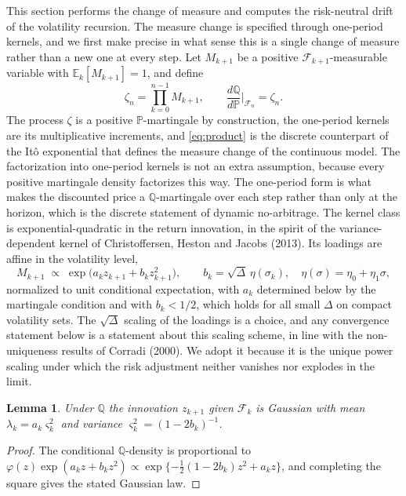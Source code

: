 \documentclass[11pt]{article}
\newtheorem{lemma}[theorem]{Lemma}
\theoremstyle{remark}
\newcommand{\E}{\mathbb{E}}
\newcommand{\Pm}{\mathbb{P}}
\newcommand{\Qm}{\mathbb{Q}}
\newcommand{\Dt}{\Delta}
\begin{document}
This section performs the change of measure and computes the risk-neutral
drift of the volatility recursion.
The measure change is specified through one-period kernels, and we first
make precise in what sense this is a single change of measure rather than a
new one at every step.
Let $M_{k+1}$ be a positive $\mathcal{F}_{k+1}$-measurable variable with
$\E_k[M_{k+1}]=1$, and define
\begin{equation}\label{eq:product}
\zeta_n=\prod_{k=0}^{n-1}M_{k+1},
\qquad
\frac{d\Qm}{d\Pm}\Big|_{\mathcal{F}_n}=\zeta_n .
\end{equation}
The process $\zeta$ is a positive $\Pm$-martingale by construction, the
one-period kernels are its multiplicative increments, and \eqref{eq:product}
is the discrete counterpart of the It\^{o} exponential that defines the
measure change of the continuous model.
The factorization into one-period kernels is not an extra assumption,
because every positive martingale density factorizes this way.
The one-period form is what makes the discounted price a $\Qm$-martingale
over each step rather than only at the horizon, which is the discrete
statement of dynamic no-arbitrage.
The kernel class is exponential-quadratic in the return innovation, in the
spirit of the variance-dependent kernel of Christoffersen, Heston and
Jacobs (2013).
Its loadings are affine in the volatility level,
\begin{equation}\label{eq:kernel}
M_{k+1}
\;\propto\;
\exp\!\big(a_k z_{k+1}+b_k z_{k+1}^2\big),
\qquad
b_k=\sqrt{\Dt}\,\eta(\sigma_k),\quad
\eta(\sigma)=\eta_0+\eta_1\sigma ,
\end{equation}
normalized to unit conditional expectation, with $a_k$ determined below by
the martingale condition and with $b_k<1/2$, which holds for all small
$\Dt$ on compact volatility sets.
The $\sqrt{\Dt}$ scaling of the loadings is a choice, and any convergence
statement below is a statement about this scaling scheme, in line with the
non-uniqueness results of Corradi (2000).
We adopt it because it is the unique power scaling under which the risk
adjustment neither vanishes nor explodes in the limit.

\begin{lemma}\label{lem:qlaw}
Under $\Qm$ the innovation $z_{k+1}$ given $\mathcal{F}_k$ is Gaussian with
mean $\lambda_k=a_k\varsigma_k^2$ and variance
$\varsigma_k^{2}=(1-2b_k)^{-1}$.
\end{lemma}

\begin{proof}
The conditional $\Qm$-density is proportional to
$\varphi(z)\exp(a_k z+b_k z^2)
\propto\exp\{-\tfrac{1}{2}(1-2b_k)z^2+a_k z\}$, and completing the square
gives the stated Gaussian law.
\end{proof}
\end{document}
